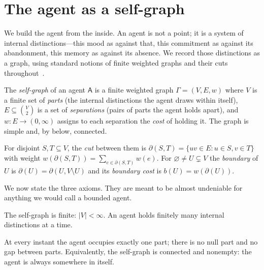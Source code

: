 \documentclass[11pt,twocolumn,a4paper]{article}
\newcommand{\Agent}{\mathsf{A}}
\newcommand{\Self}{\Gamma}          %
\newcommand{\V}{V}
\newcommand{\E}{E}
\newcommand{\wt}{w}
\newcommand{\cut}{\partial}
\newcommand{\abs}[1]{\lvert#1\rvert}
\begin{document}
\section{The agent as a self-graph}
\label{sec:setting}

We build the agent from the inside. An agent is not a point; it is a
system of internal distinctions---this mood as against that, this
commitment as against its abandonment, this memory as against its
absence. We record those distinctions as a graph, using standard notions
of finite weighted graphs and their cuts throughout~\cite{bondymurty2008,%
diestel2017,west2001}.

\begin{definition}
\label{def:selfgraph}
The \emph{self-graph} of an agent $\Agent$ is a finite weighted graph
$\Self=(\V,\E,\wt)$ where $\V$ is a finite set of \emph{parts} (the
internal distinctions the agent draws within itself), $\E\subseteq
\binom{\V}{2}$ is a set of \emph{separations} (pairs of parts the agent
holds apart), and $\wt:\E\to(0,\infty)$ assigns to each separation the
\emph{cost} of holding it. The graph is simple and, by
 below, connected.
\end{definition}

\begin{definition}
\label{def:cut}
For disjoint $S,T\subseteq\V$, the \emph{cut} between them is
$\cut(S,T)=\{uv\in\E: u\in S, v\in T\}$ with weight
$\wt(\cut(S,T))=\sum_{e\in\cut(S,T)}\wt(e)$. For $\varnothing\neq
U\subsetneq\V$ the \emph{boundary} of $U$ is $\cut(U)=\cut(U,\V\setminus
U)$ and its \emph{boundary cost} is $b(U)=\wt(\cut(U))$.
\end{definition}

We now state the three axioms. They are meant to be almost
undeniable for anything we would call a bounded agent.

\begin{axiom}[Finiteness]
\label{ax:finite}
The self-graph is finite: $\abs{\V}<\infty$. An agent holds finitely many
internal distinctions at a time.
\end{axiom}

\begin{axiom}
\label{ax:present}
At every instant the agent occupies exactly one part; there is no
null part and no gap between parts. Equivalently, the self-graph is
connected and nonempty: the agent is always somewhere in itself.
\end{axiom}
\end{document}
